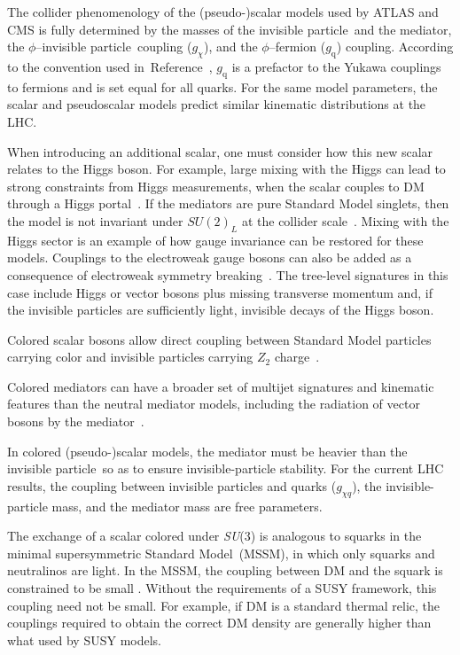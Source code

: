 \documentclass{ar-1col}
\newcommand{\chiDM}{\ensuremath{\chi}\xspace}
\newcommand{\IP}{invisible particle}
\newcommand{\gDM}{\ensuremath{g_{\chiDM}}\xspace}
\newcommand{\gdm}{\gDM}
\newcommand{\gdmq}{\ensuremath{g_{\chiDM q}}\xspace}
\newcommand{\gq}{$g_{\mathrm{q}}$\xspace}
\begin{document}
The collider phenomenology of the (pseudo-)scalar models used by ATLAS and CMS is fully
determined by the masses of the \IP\  and the mediator, the
$\phi$--\IP\  coupling (\gdm), and the $\phi$--fermion (\gq) coupling.
According to the convention used in~Reference~, \gq is a
prefactor to the Yukawa couplings to fermions and is set equal for
all quarks. For the same model parameters, the scalar and
pseudoscalar models predict similar kinematic distributions at the LHC.

When introducing an additional scalar, one must consider how this new
scalar relates to the Higgs boson. For example, large mixing with the Higgs can
lead to strong constraints from Higgs measurements, 
when the scalar couples to DM through a Higgs
portal~\cite{Berlin:2014cfa}. If the mediators are pure Standard Model
singlets, then the model is not invariant under
$SU(2)_L$ at the collider scale~\cite{Bell:2016ekl}. Mixing
with the Higgs sector is an example of how gauge invariance can be restored for these models. 
Couplings to the electroweak
gauge bosons can also be added as a consequence of electroweak
symmetry breaking~\cite{Bauer:2016gys,Englert:2016joy}. The
tree-level signatures in this case include Higgs or vector bosons
plus missing transverse momentum and, if the {\IP}s are
sufficiently light, invisible decays of the Higgs boson.

{Colored scalar bosons} allow direct
coupling between Standard Model particles carrying color and {\IP}s carrying $Z_2$
charge~\cite{Bai:2013iqa, Papucci:2014iwa, An:2013xka,
Bell:2012rg,Ko:2016zxg}.

Colored mediators can have a broader set of
multijet signatures and kinematic features than the neutral
mediator models, including the radiation of vector bosons by the
mediator~\cite{Bell:2012rg}.

In colored (pseudo-)scalar models, the mediator must be heavier
than the \IP\ so as  to ensure invisible-particle stability. For the current LHC results,
the coupling between {\IP}s and quarks (\gdmq), the invisible-particle  mass, and
the mediator mass are free parameters.

The exchange of a scalar colored under \textit{SU}(3) is analogous to
squarks in the minimal supersymmetric Standard Model\ (MSSM), in which only squarks and neutralinos are light.
In the MSSM, the coupling between DM and the squark is constrained
to be small \cite{Abercrombie:2015wmb}. Without the requirements
of a SUSY framework, this coupling need not be small. For example,
if DM is a standard thermal relic, the couplings required to
obtain the correct DM density are generally higher than
what used by SUSY models. 
\end{document}
